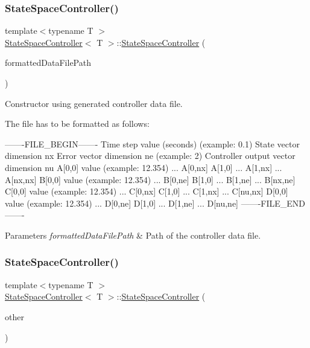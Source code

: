 \subsubsection{\texorpdfstring{State\+Space\+Controller()}{StateSpaceController()}\hspace{0.1cm}{\footnotesize\ttfamily [3/4]}}
{\footnotesize\ttfamily template$<$typename T $>$ \\
\hyperlink{classStateSpaceController}{State\+Space\+Controller}$<$ T $>$\+::\hyperlink{classStateSpaceController}{State\+Space\+Controller} (\begin{DoxyParamCaption}\item[{std\+::string}]{formatted\+Data\+File\+Path }\end{DoxyParamCaption})}



Constructor using generated controller data file. 

The file has to be formatted as follows\+: \begin{DoxyVerb}-------FILE_BEGIN-------
Time step value (seconds) (example: 0.1)
State vector dimension nx
Error vector dimension ne (example: 2)
Controller output vector dimension nu
A[0,0] value (example: 12.354)
...
A[0,nx]
A[1,0]
...
A[1,nx]
...
A[nx,nx]
B[0,0] value (example: 12.354)
...
B[0,ne]
B[1,0]
...
B[1,ne]
...
B[nx,ne]
C[0,0] value (example: 12.354)
...
C[0,nx]
C[1,0]
...
C[1,nx]
...
C[nu,nx]
D[0,0] value (example: 12.354)
...
D[0,ne]
D[1,0]
...
D[1,ne]
...
D[nu,ne]
-------FILE_END-------
\end{DoxyVerb}
 
\begin{DoxyParams}{Parameters}
{\em formatted\+Data\+File\+Path} & Path of the controller data file. \\
\hline
\end{DoxyParams}
\mbox{\label{classStateSpaceController_a7bd95b4727613f5ea3f2a3b1c0321cc3}} 
\subsubsection{\texorpdfstring{State\+Space\+Controller()}{StateSpaceController()}\hspace{0.1cm}{\footnotesize\ttfamily [4/4]}}
{\footnotesize\ttfamily template$<$typename T $>$ \\
\hyperlink{classStateSpaceController}{State\+Space\+Controller}$<$ T $>$\+::\hyperlink{classStateSpaceController}{State\+Space\+Controller} (\begin{DoxyParamCaption}\item[{\hyperlink{classStateSpaceController}{State\+Space\+Controller}$<$ T $>$ const \&}]{other }\end{DoxyParamCaption})}



